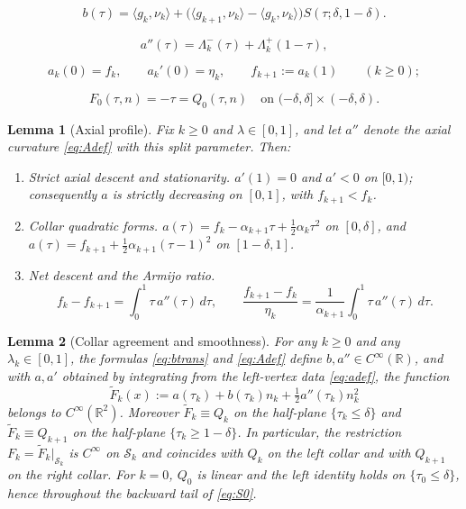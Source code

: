 \documentclass[10pt,a4paper]{amsart}
\newtheorem{lemma}{Lemma}
\newcommand{\R}{\mathbb{R}}
\newcommand{\ip}[2]{\langle #1,#2\rangle}
\begin{document}
\begin{equation}
\label{eq:btrans}
b(\tau) = \ip{g_k}{\nu_k} + \bigl(\ip{g_{k+1}}{\nu_k} - \ip{g_k}{\nu_k}\bigr)
S(\tau; \delta, 1-\delta).
\end{equation}

\begin{equation}
\label{eq:Adef}
a''(\tau) = \Lambda_k^-(\tau) + \Lambda_k^+(1-\tau),
\end{equation}

\begin{equation}
\label{eq:adef}
a_k(0)=f_k, \qquad a_k'(0)=\eta_k, \qquad f_{k+1}:=a_k(1) \qquad (k\ge0);
\end{equation}

\begin{equation}
\label{eq:Q0collar}
F_0(\tau, n) = -\tau = Q_0(\tau, n) \quad\text{on } (-\delta, \delta] \times (-\delta, \delta).
\end{equation}

\begin{lemma}[Axial profile]
\label{lem:profile}
Fix $k\ge0$ and $\lambda\in[0,1]$, and let $a''$ denote the axial curvature \eqref{eq:Adef} with this split parameter. Then:
\begin{enumerate}
\item[(i)] \emph{Strict axial descent and stationarity.} $a'(1)=0$ and $a'<0$ on $[0,1)$; consequently $a$ is strictly decreasing on $[0,1]$, with $f_{k+1}<f_k$.
\item[(ii)] \emph{Collar quadratic forms.} $a(\tau)=f_k-\alpha_{k+1}\tau+\tfrac12\alpha_k\tau^2$ on $[0,\delta]$, and $a(\tau)=f_{k+1}+\tfrac12\alpha_{k+1}(\tau-1)^2$ on $[1-\delta,1]$.
\item[(iii)] \emph{Net descent and the Armijo ratio.}
\begin{equation}
\label{eq:rhocentroid}
f_k-f_{k+1}=\int_0^1\tau\,a''(\tau)\,d\tau, \qquad
\frac{f_{k+1}-f_k}{\eta_k} = \frac1{\alpha_{k+1}}\int_0^1\tau\,a''(\tau)\,d\tau.
\end{equation}
\end{enumerate}
\end{lemma}

\begin{lemma}[Collar agreement and smoothness]
\label{lem:collar}
For any $k\ge0$ and any $\lambda_k\in[0,1]$, the formulas \eqref{eq:btrans} and \eqref{eq:Adef} define $b,a''\in C^\infty(\R)$, and with $a,a'$ obtained by integrating from the left-vertex data \eqref{eq:adef}, the function
\begin{equation}
\label{eq:Ftilde}
\widetilde F_k(x) := a(\tau_k)+b(\tau_k)n_k+\tfrac12 a''(\tau_k)n_k^2
\end{equation}
belongs to $C^\infty(\R^2)$. Moreover $\widetilde F_k\equiv Q_k$ on the half-plane $\{\tau_k\le\delta\}$ and $\widetilde F_k\equiv Q_{k+1}$ on the half-plane $\{\tau_k\ge 1-\delta\}$. In particular, the restriction $F_k=\widetilde F_k\big|_{\mathcal S_k}$ is $C^\infty$ on $\mathcal S_k$ and coincides with $Q_k$ on the left collar and with $Q_{k+1}$ on the right collar. For $k=0$, $Q_0$ is linear and the left identity holds on $\{\tau_0\le\delta\}$, hence throughout the backward tail of \eqref{eq:S0}.
\end{lemma}
\end{document}
